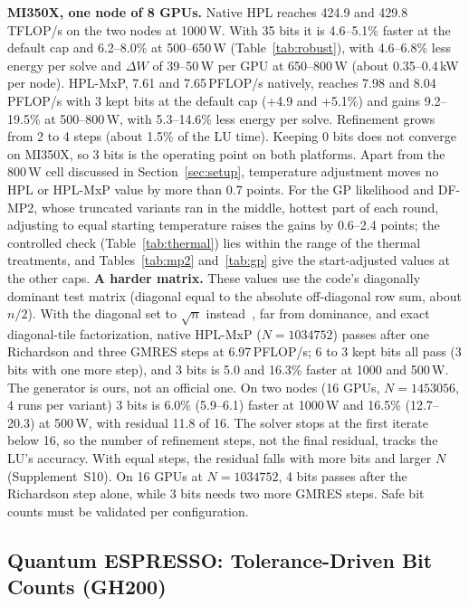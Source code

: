 \documentclass[conference]{IEEEtran}
\newcommand{\W}{\,W}
\newcommand{\pct}{\%}
\begin{document}
\textbf{MI350X, one node of 8 GPUs.} Native HPL reaches 424.9 and 429.8\,TFLOP/s on the two nodes at 1000\W. With 35 bits
it is 4.6--5.1\pct{} faster at the default cap and 6.2--8.0\pct{} at 500--650\W{} (Table~\ref{tab:robust}),
with 4.6--6.8\pct{} less energy per solve and $\Delta W$ of 39--50\W{} per GPU at
650--800\W{} (about 0.35--0.4\,kW per node). HPL-MxP, 7.61 and 7.65\,PFLOP/s natively, reaches 7.98 and
8.04\,PFLOP/s with 3 kept bits at the default cap (+4.9 and +5.1\pct) and gains 9.2--19.5\pct{} at 500--800\W, with
5.3--14.6\pct{} less energy per solve. Refinement grows from 2 to 4 steps (about 1.5\pct{} of the LU time). Keeping 0 bits
does not converge on MI350X, so 3 bits is the operating point on both platforms. Apart from the 800\W{} cell discussed
in Section~\ref{sec:setup}, temperature adjustment moves no HPL or HPL-MxP value by more than 0.7 points. For the GP likelihood and
DF-MP2, whose truncated variants ran in the middle, hottest part of each round, adjusting to equal starting temperature
raises the gains by 0.6--2.4 points; the controlled check (Table~\ref{tab:thermal}) lies within the range of the thermal
treatments, and Tables~\ref{tab:mp2} and~\ref{tab:gp} give the start-adjusted values at the other caps. \textbf{A harder matrix.} These values use the code's diagonally dominant test matrix (diagonal equal to the absolute
off-diagonal row sum, about $n/2$). With the diagonal set to $\sqrt n$ instead~\cite{Dongarra2025}, far from dominance,
and exact diagonal-tile factorization, native HPL-MxP ($N=1034752$) passes after one Richardson and three GMRES steps at
6.97\,PFLOP/s; 6 to 3 kept bits all pass (3 bits with one more step), and 3 bits is 5.0 and 16.3\pct{} faster at 1000 and
500\W. The generator is ours, not an official one. On two nodes (16 GPUs, $N=1453056$, 4 runs per variant) 3 bits is
6.0\pct{} (5.9--6.1) faster at 1000\W{} and 16.5\pct{} (12.7--20.3) at 500\W, with residual 11.8 of 16. The solver stops
at the first iterate below 16, so the number of refinement steps, not the final residual, tracks the LU's accuracy. With
equal steps, the residual falls with more bits and larger $N$ (Supplement~S10). On 16 GPUs at $N=1034752$, 4 bits passes
after the Richardson step alone, while 3 bits needs two more GMRES steps. Safe bit counts must be validated per
configuration.

\subsection{Quantum ESPRESSO: Tolerance-Driven Bit Counts (GH200)}\label{sec:adaptive}
\end{document}
